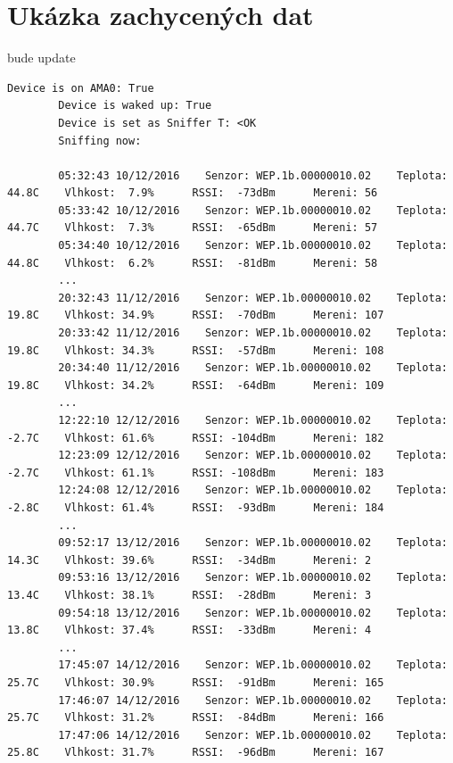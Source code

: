 \chapter{Ukázka zachycených dat}
\label{PrilohaVystup}
	\colorbox[rgb]{1,0,0}{bude update}
	\begin{lstlisting}[style=MyCodeBash]
		Device is on AMA0: True
		Device is waked up: True
		Device is set as Sniffer T: <OK
		Sniffing now:

		05:32:43 10/12/2016    Senzor: WEP.1b.00000010.02    Teplota: 44.8C    Vlhkost:  7.9%      RSSI:  -73dBm      Mereni: 56
		05:33:42 10/12/2016    Senzor: WEP.1b.00000010.02    Teplota: 44.7C    Vlhkost:  7.3%      RSSI:  -65dBm      Mereni: 57
		05:34:40 10/12/2016    Senzor: WEP.1b.00000010.02    Teplota: 44.8C    Vlhkost:  6.2%      RSSI:  -81dBm      Mereni: 58
		...
		20:32:43 11/12/2016    Senzor: WEP.1b.00000010.02    Teplota: 19.8C    Vlhkost: 34.9%      RSSI:  -70dBm      Mereni: 107
		20:33:42 11/12/2016    Senzor: WEP.1b.00000010.02    Teplota: 19.8C    Vlhkost: 34.3%      RSSI:  -57dBm      Mereni: 108
		20:34:40 11/12/2016    Senzor: WEP.1b.00000010.02    Teplota: 19.8C    Vlhkost: 34.2%      RSSI:  -64dBm      Mereni: 109
		...
		12:22:10 12/12/2016    Senzor: WEP.1b.00000010.02    Teplota: -2.7C    Vlhkost: 61.6%      RSSI: -104dBm      Mereni: 182
		12:23:09 12/12/2016    Senzor: WEP.1b.00000010.02    Teplota: -2.7C    Vlhkost: 61.1%      RSSI: -108dBm      Mereni: 183 
		12:24:08 12/12/2016    Senzor: WEP.1b.00000010.02    Teplota: -2.8C    Vlhkost: 61.4%      RSSI:  -93dBm      Mereni: 184
		...
		09:52:17 13/12/2016    Senzor: WEP.1b.00000010.02    Teplota: 14.3C    Vlhkost: 39.6%      RSSI:  -34dBm      Mereni: 2
		09:53:16 13/12/2016    Senzor: WEP.1b.00000010.02    Teplota: 13.4C    Vlhkost: 38.1%      RSSI:  -28dBm      Mereni: 3 
		09:54:18 13/12/2016    Senzor: WEP.1b.00000010.02    Teplota: 13.8C    Vlhkost: 37.4%      RSSI:  -33dBm      Mereni: 4
		...
		17:45:07 14/12/2016    Senzor: WEP.1b.00000010.02    Teplota: 25.7C    Vlhkost: 30.9%      RSSI:  -91dBm      Mereni: 165
		17:46:07 14/12/2016    Senzor: WEP.1b.00000010.02    Teplota: 25.7C    Vlhkost: 31.2%      RSSI:  -84dBm      Mereni: 166
		17:47:06 14/12/2016    Senzor: WEP.1b.00000010.02    Teplota: 25.8C    Vlhkost: 31.7%      RSSI:  -96dBm      Mereni: 167

	\end{lstlisting}
	
